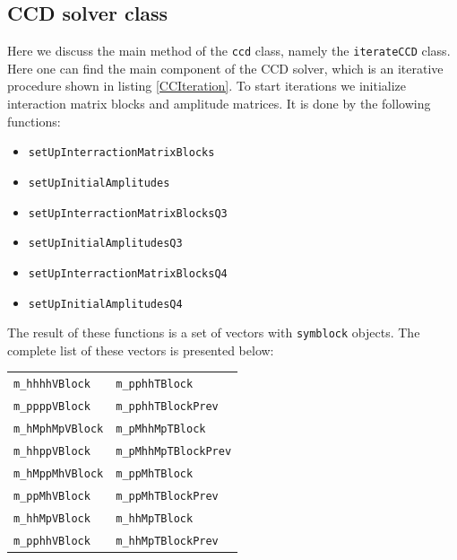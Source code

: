 \documentclass[twoside,english]{uiofysmaster}
\newcommand{\classname}[1]{\texttt{#1}}
\begin{document}
\subsection{CCD solver class}\label{ccdsolversec}

Here we discuss the main method of the \classname{ccd} class, namely the \classname{iterateCCD} class. Here one can find the main component of the CCD solver, which is an iterative procedure shown in listing \ref{CCIteration}.
To start iterations we initialize interaction matrix blocks and amplitude matrices. It is done by the following functions:
\begin{itemize}    
	\item    \classname{setUpInterractionMatrixBlocks}
	\item    \classname{setUpInitialAmplitudes}
	\item    \classname{setUpInterractionMatrixBlocksQ3}
	\item    \classname{setUpInitialAmplitudesQ3}
	\item    \classname{setUpInterractionMatrixBlocksQ4}
	\item    \classname{setUpInitialAmplitudesQ4}
\end{itemize}

The result of these functions is a set of vectors with \classname{symblock} objects. The complete list of these vectors is presented below:


\begin{table}[h!]
	
	\begin{center}
		\begin{tabular}{ll}
			\classname{m_hhhhVBlock}	& \classname{m_pphhTBlock} \\ 
			\classname{m_ppppVBlock}	& \classname{m_pphhTBlockPrev} \\ 
			\classname{m_hMphMpVBlock}	& \classname{m_pMhhMpTBlock} \\ 
			\classname{m_hhppVBlock}	&  \classname{m_pMhhMpTBlockPrev}\\ 
			\classname{m_hMppMhVBlock}	& \classname{m_ppMhTBlock} \\ 
			\classname{m_ppMhVBlock}	& \classname{m_ppMhTBlockPrev} \\ 
			\classname{m_hhMpVBlock}	&  \classname{m_hhMpTBlock}\\ 
			\classname{m_pphhVBlock}	& \classname{m_hhMpTBlockPrev}\\
		\end{tabular} 
	\end{center}
\end{table}
\end{document}
